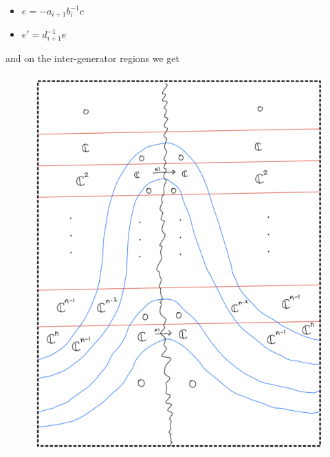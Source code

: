 \begin{enumerate}[label = (Step \arabic*)]
\begin{itemize}
\item $e = -a_{i+1}b_i^{-1}c$
\item $e' = d_{i+1}^{-1}e$
\end{itemize}
\pagebreak
and on the inter-generator regions we get
\begin{figure}[H]
    \centering
    \includegraphics[scale = 0.95]{diagrams/cobord_full/4.png}
    \caption{}
    \label{fig:your-label}
\end{figure}


\end{enumerate}
